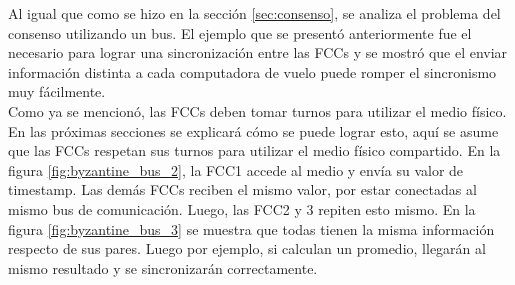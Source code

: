 
Al igual que como se hizo en la sección \ref{sec:consenso}, se analiza el problema del consenso utilizando un bus. El ejemplo que se presentó anteriormente fue el necesario para lograr una sincronización entre las FCCs y se mostró que el enviar información distinta a cada computadora de vuelo puede romper el sincronismo muy fácilmente.\\

Como ya se mencionó, las FCCs deben tomar turnos para utilizar el medio físico. En las próximas secciones se explicará cómo se puede lograr esto, aquí se asume que las FCCs respetan sus turnos para utilizar el medio físico compartido. En la figura \ref{fig:byzantine_bus_2}, la FCC1 accede al medio y envía su valor de timestamp. Las demás FCCs reciben el mismo valor, por estar conectadas al mismo bus de comunicación. Luego, las FCC2 y 3 repiten esto mismo. En la figura \ref{fig:byzantine_bus_3} se muestra que todas tienen la misma información respecto de sus pares. Luego por ejemplo, si calculan un promedio, llegarán al mismo resultado y se sincronizarán correctamente.

